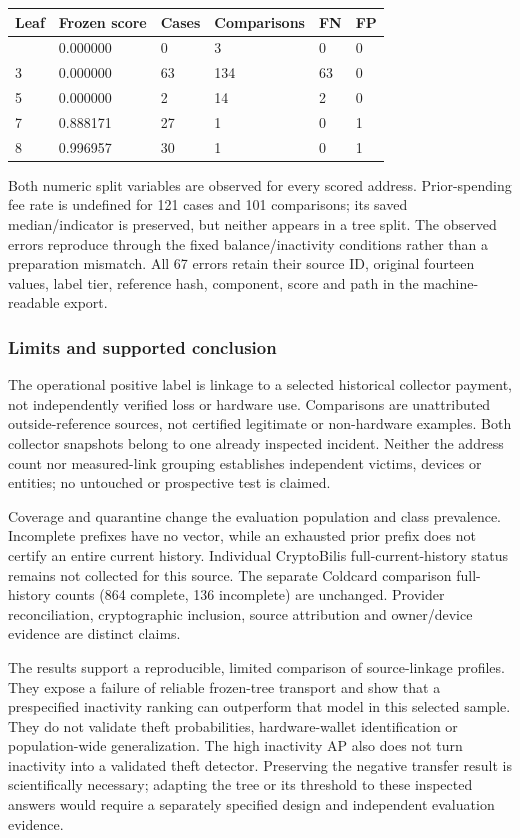 \begin{longtable}[]{@{}llllll@{}}
\toprule\noalign{}
Leaf & Frozen score & Cases & Comparisons & FN & FP \\
\midrule\noalign{}
\endhead
\bottomrule\noalign{}
\endlastfoot
2 & 0.000000 & 0 & 3 & 0 & 0 \\
3 & 0.000000 & 63 & 134 & 63 & 0 \\
5 & 0.000000 & 2 & 14 & 2 & 0 \\
7 & 0.888171 & 27 & 1 & 0 & 1 \\
8 & 0.996957 & 30 & 1 & 0 & 1 \\
\end{longtable}

Both numeric split variables are observed for every scored address.
Prior-spending fee rate is undefined for 121 cases and 101 comparisons;
its saved median/indicator is preserved, but neither appears in a tree
split. The observed errors reproduce through the fixed
balance/inactivity conditions rather than a preparation mismatch. All 67
errors retain their source ID, original fourteen values, label tier,
reference hash, component, score and path in the machine-readable
export.

\subsubsection{Limits and supported
conclusion}\label{limits-and-supported-conclusion}

The operational positive label is linkage to a selected historical
collector payment, not independently verified loss or hardware use.
Comparisons are unattributed outside-reference sources, not certified
legitimate or non-hardware examples. Both collector snapshots belong to
one already inspected incident. Neither the address count nor
measured-link grouping establishes independent victims, devices or
entities; no untouched or prospective test is claimed.

Coverage and quarantine change the evaluation population and class
prevalence. Incomplete prefixes have no vector, while an exhausted prior
prefix does not certify an entire current history. Individual
CryptoBilis full-current-history status remains not collected for this
source. The separate Coldcard comparison full-history counts (864
complete, 136 incomplete) are unchanged. Provider reconciliation,
cryptographic inclusion, source attribution and owner/device evidence
are distinct claims.

The results support a reproducible, limited comparison of source-linkage
profiles. They expose a failure of reliable frozen-tree transport and
show that a prespecified inactivity ranking can outperform that model in
this selected sample. They do not validate theft probabilities,
hardware-wallet identification or population-wide generalization. The
high inactivity AP also does not turn inactivity into a validated theft
detector. Preserving the negative transfer result is scientifically
necessary; adapting the tree or its threshold to these inspected answers
would require a separately specified design and independent evaluation
evidence.

\endgroup
